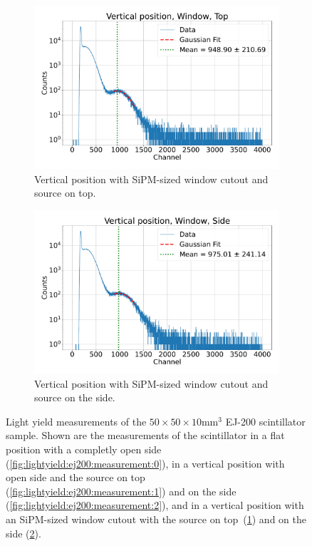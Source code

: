 \begin{figure}[hp]
     \begin{subfigure}[b]{0.48\textwidth}
        \includegraphics[width=\linewidth]{fig/lightyield/ej200/bps_ej200_window.pdf}
        \caption{Vertical position with \gls{SiPM}-sized window cutout and source on top.}\label{fig:lightyield:ej200:measurement:3}
    \end{subfigure}
    \hfill
    \begin{subfigure}[b]{0.48\textwidth}
        \includegraphics[width=\linewidth]{fig/lightyield/ej200/bps_ej200_window_side.pdf}
        \caption{Vertical position with \gls{SiPM}-sized window cutout and source on the side.}\label{fig:lightyield:ej200:measurement:4}
    \end{subfigure}

    \caption{Light yield measurements of the $50 \times 50 \times 10 \si{\milli\meter\cubed}$ EJ-200 scintillator sample. Shown are the measurements of the scintillator in a flat position with a completly open side (\ref{fig:lightyield:ej200:measurement:0}), in a vertical position with open side and the source on top (\ref{fig:lightyield:ej200:measurement:1}) and on the side (\ref{fig:lightyield:ej200:measurement:2}), and in a vertical position with an \gls{SiPM}-sized window cutout with the source on top~(\ref{fig:lightyield:ej200:measurement:3}) and on the side (\ref{fig:lightyield:ej200:measurement:4}).}\label{fig:lightyield:ej200:measurement}
\end{figure}

